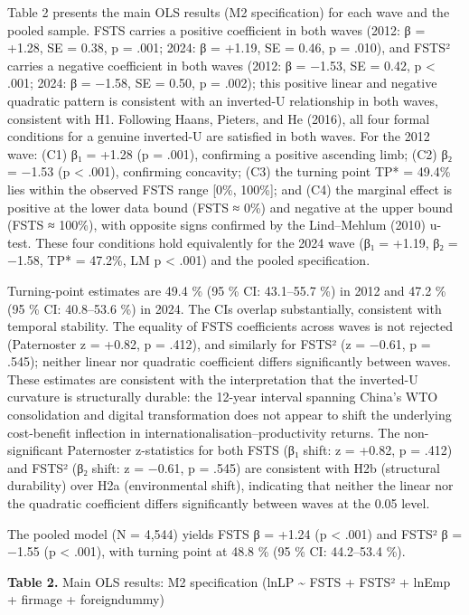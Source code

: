 \documentclass[
  12pt,a4paper]{article}
\begin{document}
Table 2 presents the main OLS results (M2 specification) for each wave
and the pooled sample. FSTS carries a positive coefficient in both waves
(2012: β = +1.28, SE = 0.38, p = .001; 2024: β = +1.19, SE = 0.46, p =
.010), and FSTS² carries a negative coefficient in both waves (2012: β =
−1.53, SE = 0.42, p \textless{} .001; 2024: β = −1.58, SE = 0.50, p =
.002); this positive linear and negative quadratic pattern is consistent
with an inverted-U relationship in both waves, consistent with H1.
Following Haans, Pieters, and He (2016), all four formal conditions for
a genuine inverted-U are satisfied in both waves. For the 2012 wave:
(C1) β₁ = +1.28 (p = .001), confirming a positive ascending limb; (C2)
β₂ = −1.53 (p \textless{} .001), confirming concavity; (C3) the turning
point TP* = 49.4\% lies within the observed FSTS range {[}0\%, 100\%{]};
and (C4) the marginal effect is positive at the lower data bound (FSTS ≈
0\%) and negative at the upper bound (FSTS ≈ 100\%), with opposite signs
confirmed by the Lind--Mehlum (2010) u-test. These four conditions hold
equivalently for the 2024 wave (β₁ = +1.19, β₂ = −1.58, TP* = 47.2\%, LM
p \textless{} .001) and the pooled specification.

Turning-point estimates are 49.4 \% (95 \% CI: 43.1--55.7 \%) in 2012
and 47.2 \% (95 \% CI: 40.8--53.6 \%) in 2024. The CIs overlap
substantially, consistent with temporal stability. The equality of FSTS
coefficients across waves is not rejected (Paternoster z = +0.82, p =
.412), and similarly for FSTS² (z = −0.61, p = .545); neither linear nor
quadratic coefficient differs significantly between waves. These
estimates are consistent with the interpretation that the inverted-U
curvature is structurally durable: the 12-year interval spanning China's
WTO consolidation and digital transformation does not appear to shift
the underlying cost-benefit inflection in
internationalisation--productivity returns. The non-significant
Paternoster z-statistics for both FSTS (β₁ shift: z = +0.82, p = .412)
and FSTS² (β₂ shift: z = −0.61, p = .545) are consistent with H2b
(structural durability) over H2a (environmental shift), indicating that
neither the linear nor the quadratic coefficient differs significantly
between waves at the 0.05 level.

The pooled model (N = 4,544) yields FSTS β = +1.24 (p \textless{} .001)
and FSTS² β = −1.55 (p \textless{} .001), with turning point at 48.8 \%
(95 \% CI: 44.2--53.4 \%).

\textbf{Table 2.} Main OLS results: M2 specification (lnLP
\textasciitilde{} FSTS + FSTS² + lnEmp + firmage + foreigndummy)
\end{document}
